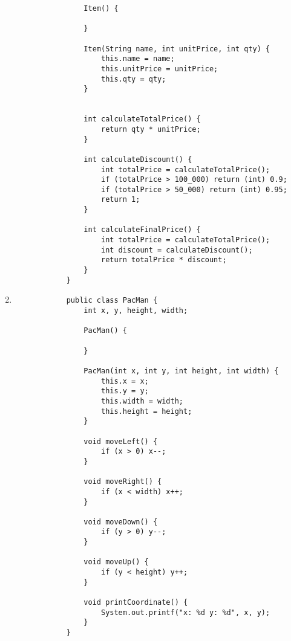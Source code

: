 \documentclass[12pt,titlepage]{article}
\begin{document}
\begin{enumerate}
{\begin{verbatim}
                Item() {

                }

                Item(String name, int unitPrice, int qty) {
                    this.name = name;
                    this.unitPrice = unitPrice;
                    this.qty = qty;
                }

                
                int calculateTotalPrice() {
                    return qty * unitPrice;
                }

                int calculateDiscount() {
                    int totalPrice = calculateTotalPrice();
                    if (totalPrice > 100_000) return (int) 0.9;
                    if (totalPrice > 50_000) return (int) 0.95;
                    return 1;
                }

                int calculateFinalPrice() {
                    int totalPrice = calculateTotalPrice();
                    int discount = calculateDiscount();
                    return totalPrice * discount;
                }
            }
        \end{verbatim}
    }

\newpage
    \item {
        \begin{verbatim}
            public class PacMan {
                int x, y, height, width;
                
                PacMan() {

                }

                PacMan(int x, int y, int height, int width) {
                    this.x = x;
                    this.y = y;
                    this.width = width;
                    this.height = height;
                }

                void moveLeft() {
                    if (x > 0) x--;
                }

                void moveRight() {
                    if (x < width) x++;
                }

                void moveDown() {
                    if (y > 0) y--;
                }

                void moveUp() {
                    if (y < height) y++;
                }

                void printCoordinate() {
                    System.out.printf("x: %d y: %d", x, y);
                }
            }
        \end{verbatim}
    }

\end{enumerate}
\end{document}

